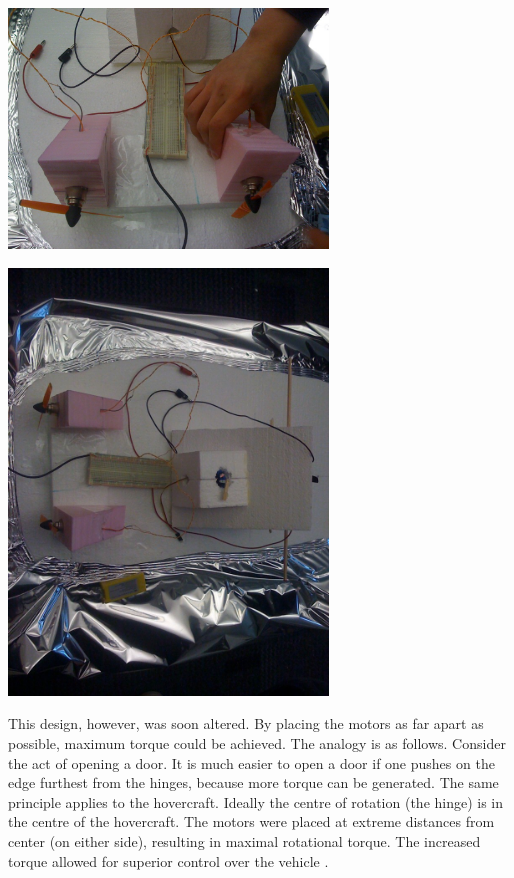 \begin{minipage}{6.5in}
\begin{minipage}{6.5in}
\begin{minipage}{6.5in}
  \begin{center}
    \includegraphics[width=85mm]{imageSources/thrustControl1.png}
  \end{center}
  \label{thrustControl1}
\end{minipage}

\begin{minipage}{6.5in}
  \begin{center}
    \includegraphics[width=85mm]{imageSources/thrustControl2.png}
  \end{center}
  \label{thrustControl2}
\end{minipage}

This design, however, was soon altered. By placing the motors as far apart as possible, maximum torque could be achieved. The analogy is as follows. Consider the act of opening a door. It is much easier to open a door if one pushes on the edge furthest from the hinges, because more torque can be generated. The same principle applies to the hovercraft. Ideally the centre of rotation (the hinge) is in the centre of the hovercraft. The motors were placed at extreme distances from center (on either side), resulting in maximal rotational torque.   The increased torque allowed for superior control over the vehicle \cite{831309}. 


\end{minipage}
\end{minipage}
